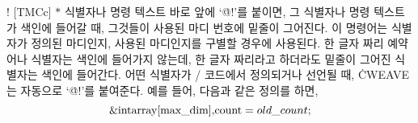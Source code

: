 \@! [TMCc] $*$
식별자나 명령 텍스트 바로 앞에 `\.{@!}'를 붙이면, 그 식별자나 명령
텍스트가 색인에 들어갈 때, 그것들이 사용된 마디 번호에 밑줄이 그어진다.
이 명령어는 식별자가 정의된 마디인지, 사용된 마디인지를 구별할 경우에
사용된다. 한 글자 짜리 예약어나 식별자는 색인에 들어가지 않는데, 한 글자
짜리라고 하더라도 밑줄이 그어진 식별자는 색인에 들어간다.
어떤 식별자가 \CEE/ 코드에서 정의되거나 선언될 때, \.{CWEAVE}는
자동으로 `\.{@!}'를 붙여준다. 예를 들어, 다음과 같은 정의를 하면,
$$\hbox{\&{int} \\{array}[\\{max\_dim}],
\\{count}${}=\\{old\_count};$}$$
